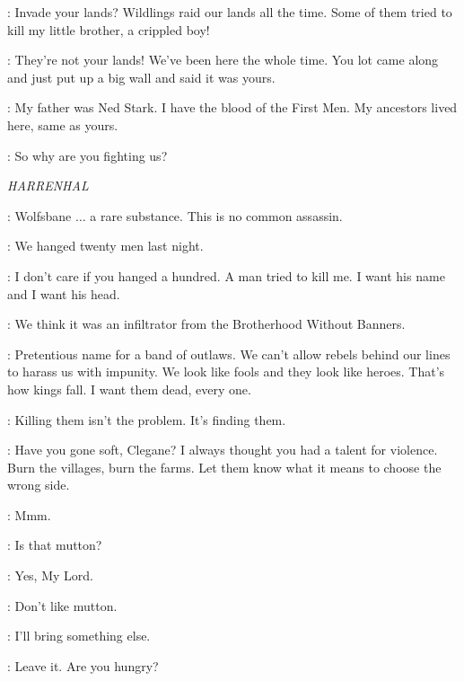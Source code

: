 \JON: Invade your lands? Wildlings raid our lands all the time. Some of them tried to kill my little brother, a crippled boy!

\YGRITTE: They're not your lands! We've been here the whole time. You lot came along and just put up a big wall and said it was yours.

\JON: My father was Ned Stark. I have the blood of the First Men. My ancestors lived here, same as yours.

\YGRITTE: So why are you fighting us?



\scene

\textit{HARRENHAL}


\TYWIN: Wolfsbane $\ldots$ a rare substance. This is no common assassin.

\MOUNTAIN: We hanged twenty men last night.

\TYWIN: I don't care if you hanged a hundred. A man tried to kill me. I want his name and I want his head.


\MOUNTAIN: We think it was an infiltrator from the Brotherhood Without Banners.

\TYWIN: Pretentious name for a band of outlaws. We can't allow rebels behind our lines to harass us with impunity. We look like fools and they look like heroes. That's how kings fall. I want them dead, every one.

\MOUNTAIN: Killing them isn't the problem. It's finding them.

\TYWIN: Have you gone soft, Clegane? I always thought you had a talent for violence. Burn the villages, burn the farms. Let them know what it means to choose the wrong side.

\MOUNTAIN: Mmm.


\TYWIN: Is that mutton?

\ARYA: Yes, My Lord.

\TYWIN: Don't like mutton.

\ARYA: I'll bring something else.

\TYWIN: Leave it. Are you hungry?

